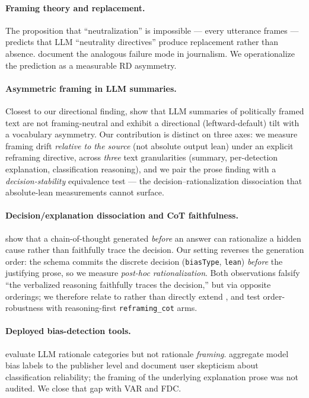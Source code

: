 \documentclass{article}
\begin{document}
\paragraph{Framing theory and replacement.} The proposition that ``neutralization'' is impossible — every utterance frames \citep{lakoff1996, entman1993} — predicts that LLM ``neutrality directives'' produce replacement rather than absence. \citet{rosen2003, boykoff2004} document the analogous failure mode in journalism. We operationalize the prediction as a measurable RD asymmetry.

\paragraph{Asymmetric framing in LLM summaries.} Closest to our directional finding, \citet{bang2024neutral} show that LLM summaries of politically framed text are not framing-neutral and exhibit a directional (leftward-default) tilt with a vocabulary asymmetry. Our contribution is distinct on three axes: we measure framing drift \emph{relative to the source} (not absolute output lean) under an explicit reframing directive, across \emph{three} text granularities (summary, per-detection explanation, classification reasoning), and we pair the prose finding with a \emph{decision-stability} equivalence test — the decision--rationalization dissociation that absolute-lean measurements cannot surface.

\paragraph{Decision/explanation dissociation and CoT faithfulness.} \citet{turpin2023} show that a chain-of-thought generated \emph{before} an answer can rationalize a hidden cause rather than faithfully trace the decision. Our setting reverses the generation order: the schema commits the discrete decision (\texttt{biasType}, \texttt{lean}) \emph{before} the justifying prose, so we measure \emph{post-hoc rationalization}. Both observations falsify ``the verbalized reasoning faithfully traces the decision,'' but via opposite orderings; we therefore relate to rather than directly extend \citeauthor{turpin2023}, and test order-robustness with reasoning-first \texttt{reframing\_cot} arms.

\paragraph{Deployed bias-detection tools.} \citet{biaslab2024} evaluate LLM rationale categories but not rationale \emph{framing}. \citet{mediabiasdetector2025} aggregate model bias labels to the publisher level and document user skepticism about classification reliability; the framing of the underlying explanation prose was not audited. We close that gap with VAR and FDC.
\end{document}
